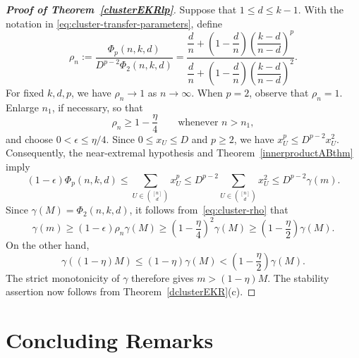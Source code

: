 \documentclass[10pt,a4paper]{amsart}
\numberwithin{equation}{section}
\begin{document}
\begin{proof}[{\bf Proof of Theorem~\ref{clusterEKRlp}}]
Suppose that $1\leq d\leq k-1$.  With the notation in
	\eqref{eq:cluster-transfer-parameters}, define
	\begin{equation}\label{eq:cluster-rho}
		\rho_n:=
		\frac{\Phi_p(n,k,d)}{D^{p-2}\Phi_2(n,k,d)}
		=\frac{\dfrac dn+\left(1-\dfrac dn\right)
			\left(\dfrac{k-d}{n-d}\right)^p}
		{\dfrac dn+\left(1-\dfrac dn\right)
			\left(\dfrac{k-d}{n-d}\right)^2}.
	\end{equation}
For fixed $k,d,p$, we have $\rho_n\to1$ as $n\to\infty$.
When $p=2$, observe that $\rho_n=1$.
Enlarge $n_1$, if necessary, so that
	\[
	\rho_n\geq1-\frac\eta4
	\qquad\text{whenever }n>n_1,
	\]
	and choose $0<\epsilon\leq\eta/4$.  Since
	$0\leq x_U\leq D$ and $p\geq2$, we have
	$x_U^p\leq D^{p-2}x_U^2$.
Consequently, the near-extremal hypothesis and Theorem~\ref{innerproductABthm} imply
$$
		(1-\epsilon)\Phi_p(n,k,d) \leq\sum_{U\in\binom{[n]}d}x_U^p
\leq D^{p-2}\sum_{U\in\binom{[n]}d}x_U^2
		\leq D^{p-2}\gamma(m).
$$
	Since $\gamma(M)=\Phi_2(n,k,d)$, it follows from~\eqref{eq:cluster-rho}
	that
	\[
	\gamma(m)\geq(1-\epsilon)\rho_n \gamma(M)
	\geq\left(1-\frac\eta4\right)^2\gamma(M)
	\geq\left(1-\frac\eta2\right)\gamma(M).
	\]
	On the other hand,
	\[
	\gamma((1-\eta)M)\leq(1-\eta)\gamma(M)
	<\left(1-\frac\eta2\right)\gamma(M).
	\]
	The strict monotonicity of $\gamma$ therefore gives
	$m>(1-\eta)M$.  The stability assertion now follows from
	Theorem~\ref{dclusterEKR}(c).
\end{proof}


\section{Concluding Remarks}\label{ConclusionSec}
\end{document}
